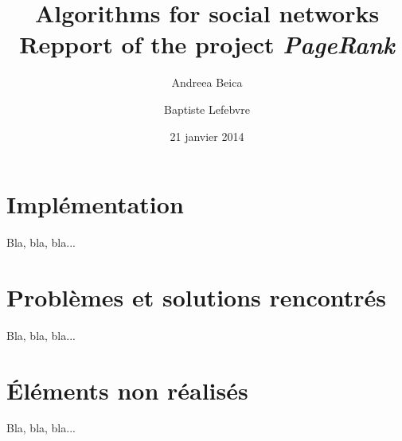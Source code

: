\documentclass[a4paper]{article}
\begin{document}
	\title{
	  \Large \textbf{Algorithms for social networks} \\
  	  \textsf{Repport of the project \emph{PageRank}}
  	}
  \author{Andreea Beica \and Baptiste Lefebvre}
	\date{21 janvier 2014}
	\maketitle


\section{Implémentation}

Bla, bla, bla...


\section{Problèmes et solutions rencontrés}

Bla, bla, bla...


\section{\'Eléments non réalisés}

Bla, bla, bla...
\end{document}
